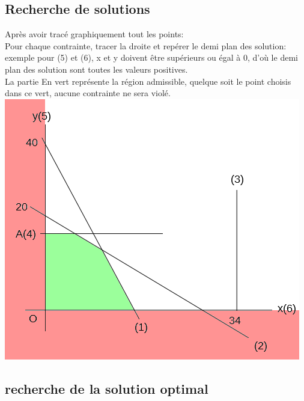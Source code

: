 \subsection{Recherche de solutions}
Après avoir tracé graphiquement tout les points:\\
Pour chaque contrainte, tracer la droite et repérer le demi plan des solution: exemple pour (5) et (6), x et y doivent être supérieurs ou égal à 0, d'où le demi plan des solution sont toutes les valeurs positives.\\
La partie En vert représente la région admissible, quelque soit le point choisis dans ce vert, aucune contrainte ne sera violé.\\
\includegraphics[scale=0.55]{img/ro-pl-2var_0.png} 
\subsection{recherche de la solution optimal}

